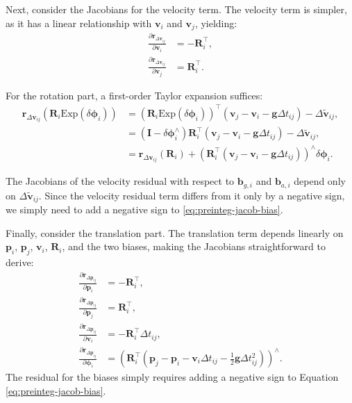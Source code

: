 Next, consider the Jacobians for the velocity term. The velocity term is simpler, as it has a linear relationship with $\mathbf{v}_i$ and $\mathbf{v}_j$, yielding:
\begin{subequations}\label{key}
	\begin{align}
		\frac{ \partial \mathbf{r}_{\Delta \mathbf{v}_{ij}}}{\partial \mathbf{v}_i} &= -\mathbf{R}_i^\top, \\
		\frac{ \partial \mathbf{r}_{\Delta \mathbf{v}_{ij}}}{\partial \mathbf{v}_j} &= \mathbf{R}_i^\top.
	\end{align}
\end{subequations}

For the rotation part, a first-order Taylor expansion suffices:
\begin{equation}
	\begin{aligned}
		\mathbf{r}_{\Delta \mathbf{v}_{ij}} \left( \mathbf{R}_i \mathrm{Exp} (\delta \boldsymbol{\phi}_i)\right) &= 
		(\mathbf{R}_i \mathrm{Exp} (\delta \boldsymbol{\phi}_i)) ^\top (\mathbf{v}_j - \mathbf{v}_i - \mathbf{g} \Delta 
		t_{ij}) - \Delta \tilde{\mathbf{v}}_{ij}, \\
		&= (\mathbf{I} - \delta \boldsymbol{\phi}^\wedge_i) \mathbf{R}_i^\top  (\mathbf{v}_j - \mathbf{v}_i - \mathbf{g} 
		\Delta t_{ij}) - \Delta \tilde{\mathbf{v}}_{ij}, \\
		&= \mathbf{r}_{\Delta \mathbf{v}_{ij}} (\mathbf{R}_i) + \left(\mathbf{R}_i^\top  (\mathbf{v}_j - \mathbf{v}_i - \mathbf{g} 
		\Delta t_{ij}) \right)^\mathrm{\wedge} \delta \boldsymbol{\phi}_i.
	\end{aligned}
\end{equation}

The Jacobians of the velocity residual with respect to $\mathbf{b}_{g,i}$ and $\mathbf{b}_{a,i}$ depend only on $\Delta \tilde{\mathbf{v}}_{ij}$. Since the velocity residual term differs from it only by a negative sign, we simply need to add a negative sign to \eqref{eq:preinteg-jacob-bias}.

Finally, consider the translation part. The translation term depends linearly on $\mathbf{p}_i$, $\mathbf{p}_j$, $\mathbf{v}_i$, $\mathbf{R}_i$, and the two biases, making the Jacobians straightforward to derive:
\begin{subequations}\label{key}
	\begin{align}
		\frac{\partial \mathbf{r}_{\Delta \mathbf{p}_{ij}}}{\partial \mathbf{p}_i } &= -\mathbf{R}_i^\top, \\
		\frac{\partial \mathbf{r}_{\Delta \mathbf{p}_{ij}}}{\partial \mathbf{p}_j } &= \mathbf{R}_i^\top, \\
		\frac{\partial \mathbf{r}_{\Delta \mathbf{p}_{ij}}}{\partial \mathbf{v}_i } &= -\mathbf{R}_i^\top \Delta t_{ij}, \\
		\frac{\partial \mathbf{r}_{\Delta \mathbf{p}_{ij}}}{\partial \boldsymbol{\phi}_i } &= \left( 
		\mathbf{R}_i^\top \left(\mathbf{p}_j - \mathbf{p}_i - \mathbf{v}_i \Delta t_{ij} - \frac{1}{2}\mathbf{g} \Delta 
		t_{ij}^2 \right) \right)^\wedge.
	\end{align}
\end{subequations}
The residual for the biases simply requires adding a negative sign to Equation \eqref{eq:preinteg-jacob-bias}.

